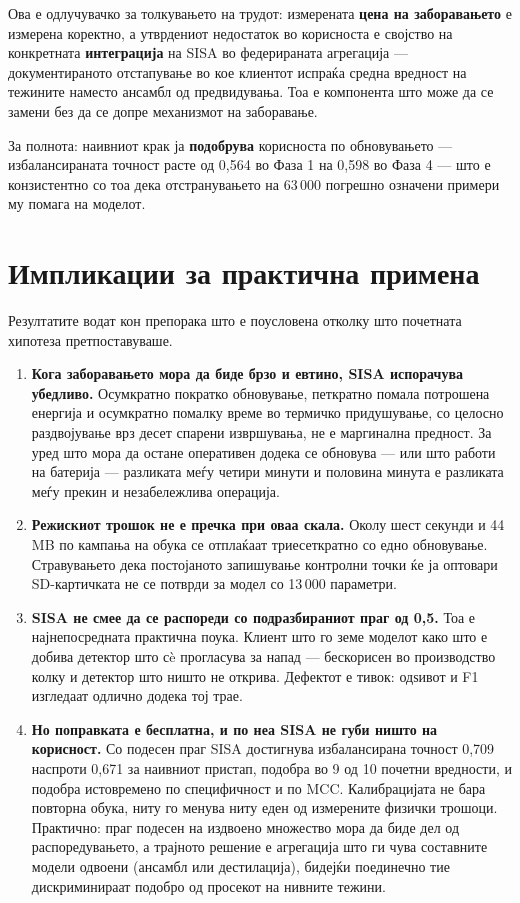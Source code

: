 Ова е одлучувачко за толкувањето на трудот: измерената \textbf{цена на заборавањето} е измерена
коректно, а утврдениот недостаток во корисноста е својство на конкретната \textbf{интеграција} на
SISA во федерираната агрегација --- документираното отстапување во кое клиентот испраќа средна
вредност на тежините наместо ансамбл од предвидувања. Тоа е компонента што може да се замени
без да се допре механизмот на заборавање.

За полнота: наивниот крак ја \textbf{подобрува} корисноста по обновувањето --- избалансираната
точност расте од 0,564 во Фаза 1 на 0,598 во Фаза 4 --- што е конзистентно со тоа дека
отстранувањето на 63\,000 погрешно означени примери му помага на моделот.

\section{Импликации за практична примена}

Резултатите водат кон препорака што е поусловена отколку што почетната хипотеза
претпоставуваше.

\begin{enumerate}
  \item \textbf{Кога заборавањето мора да биде брзо и евтино, SISA испорачува убедливо.} Осумкратно пократко обновување, петкратно помала потрошена енергија и осумкратно помалку време во термичко придушување, со целосно раздвојување врз десет спарени извршувања, не е маргинална предност. За уред што мора да остане оперативен додека се обновува --- или што работи на батерија --- разликата меѓу четири минути и половина минута е разликата меѓу прекин и незабележлива операција.
  \item \textbf{Режискиот трошок не е пречка при оваа скала.} Околу шест секунди и 44 MB по кампања на обука се отплаќаат триесеткратно со едно обновување. Стравувањето дека постојаното запишување контролни точки ќе ја оптовари SD-картичката не се потврди за модел со 13\,000 параметри.
  \item \textbf{SISA не смее да се распореди со подразбираниот праг од 0,5.} Тоа е најнепосредната практична поука. Клиент што го земе моделот како што е добива детектор што сè прогласува за напад --- бескорисен во производство колку и детектор што ништо не открива. Дефектот е тивок: одѕивот и F1 изгледаат одлично додека тој трае.
  \item \textbf{Но поправката е бесплатна, и по неа SISA не губи ништо на корисност.} Со подесен праг SISA достигнува избалансирана точност 0,709 наспроти 0,671 за наивниот пристап, подобра во 9 од 10 почетни вредности, и подобра истовремено по специфичност и по MCC. Калибрацијата не бара повторна обука, ниту го менува ниту еден од измерените физички трошоци. Практично: праг подесен на издвоено множество мора да биде дел од распоредувањето, а трајното решение е агрегација што ги чува составните модели одвоени (ансамбл или дестилација), бидејќи поединечно тие дискриминираат подобро од просекот на нивните тежини.
\end{enumerate}


